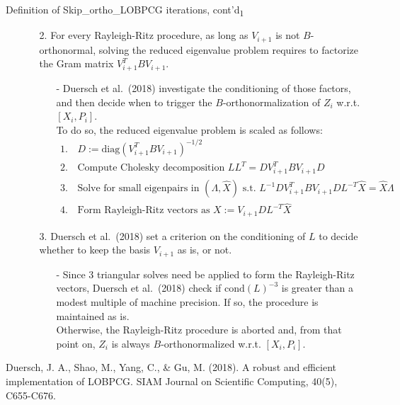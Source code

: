 \documentclass[t,usepdftitle=false]{beamer}
\begin{document}
\begin{frame}{Definition of Skip\_ortho\_LOBPCG iterations, cont'd\textsubscript{1}}
\begin{itemize}
\item[]
\begin{enumerate}
\item[2.] For every Rayleigh-Ritz procedure, as long as $V_{i+1}$ is not $B$-orthonormal, solving the reduced eigenvalue problem requires to factorize the Gram matrix $V_{i+1}^TBV_{i+1}$.\tinyskip
\begin{itemize}
\item[-] Duersch et al.~(2018) investigate the conditioning of those factors, and then decide when to trigger the $B$-orthonormalization of $Z_{i}$ w.r.t. $\![X_i,P_i]$.\\
To do so, the reduced eigenvalue problem is scaled as follows:
\begin{align*}
1.\,&D:=\text{diag}(V_{i+1}^TBV_{i+1})^{-1/2}\\
2.\,&\text{Compute Cholesky decomposition }LL^T=DV_{i+1}^TBV_{i+1}D\\
3.\,&\text{Solve\ for\ small\ eigenpairs\ in }(\Lambda,\hat{X})\text{ s.t. }\!L^{-1}DV_{i+1}^TBV_{i+1}DL^{-T}\hat{X}=\hat{X}\Lambda\\
4.\,&\text{Form Rayleigh-Ritz vectors as }X:=V_{i+1}DL ^{-T}\hat{X}
\end{align*}
\end{itemize}
\vspace{-.1cm}
\item[3.] Duersch et al.~(2018) set a criterion on the conditioning of $L$ to decide whether to keep the basis $V_{i+1}$ as is, or not.\\
\begin{itemize}
\item[-] Since 3 triangular solves need be applied to form the Rayleigh-Ritz vectors, Duersch et al.~(2018) check if $\text{cond}(L)^{-3}$ is greater than a modest multiple of machine precision.
If so, the procedure is maintained as is.\\
Otherwise, the Rayleigh-Ritz procedure is aborted and, from that point on, $Z_i$ is always $B$-orthonormalized w.r.t. $\![X_i,P_i]$.
\end{itemize}
\end{enumerate}
\end{itemize}
\tinyskip	
\tiny{Duersch, J. A., Shao, M., Yang, C., \& Gu, M. (2018). A robust and efficient implementation of LOBPCG. SIAM Journal on Scientific Computing, 40(5), C655-C676.}
\end{frame}
\end{document}
